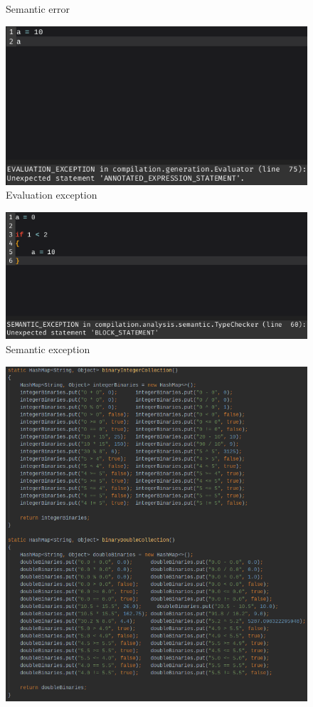 \documentclass[
]{report}
\begin{document}
\begin{appendices}
\begin{figure}
		\caption{Semantic error}
		\label{fig:semantic-error}
	\end{figure}
	\begin{figure}
		\centering
		\includegraphics[width=\textwidth]{evaluation-exception}
		\caption{Evaluation exception}
		\label{fig:evaluation-exception}
	\end{figure}
	\begin{figure}
		\centering
		\includegraphics[width=\textwidth]{semantic-exception}
		\caption{Semantic exception}
		\label{fig:semantic-exception}
	\end{figure}
	\begin{figure}
		\centering
		\includegraphics[width=\textwidth]{test-data-example}

\end{figure}
\end{appendices}
\end{document}
